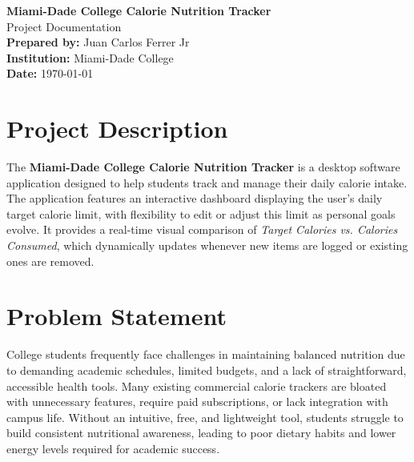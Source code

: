 \documentclass{article}
\begin{document}
\begin{center}
    {\LARGE \bfseries Miami-Dade College Calorie Nutrition Tracker} \\[0.5em]
    {\large Project Documentation} \\[1.5em]
    \textbf{Prepared by:} Juan Carlos Ferrer Jr \\[0.5em]
    \textbf{Institution:} Miami-Dade College \\
    \textbf{Date:} \today
\end{center}

\vspace{1em}

\section{Project Description}
The \textbf{Miami-Dade College Calorie Nutrition Tracker} is a desktop software application designed to help students track and manage their daily calorie intake. The application features an interactive dashboard displaying the user's daily target calorie limit, with flexibility to edit or adjust this limit as personal goals evolve. It provides a real-time visual comparison of \textit{Target Calories vs. Calories Consumed}, which dynamically updates whenever new items are logged or existing ones are removed.

\section{Problem Statement}
College students frequently face challenges in maintaining balanced nutrition due to demanding academic schedules, limited budgets, and a lack of straightforward, accessible health tools. Many existing commercial calorie trackers are bloated with unnecessary features, require paid subscriptions, or lack integration with campus life. Without an intuitive, free, and lightweight tool, students struggle to build consistent nutritional awareness, leading to poor dietary habits and lower energy levels required for academic success.

\end{document}
